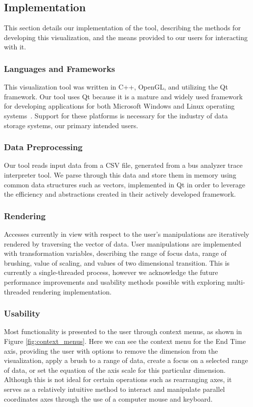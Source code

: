 \documentclass[journal]{vgtc}                %
\begin{document}
\subsection{Implementation}

This section details our implementation of the tool, describing the methods for developing this visualization, and the means provided to our users for interacting with it.

\subsubsection{Languages and Frameworks}
This visualization tool was written in C++, OpenGL, and utilizing the Qt framework. Our tool uses Qt because it is a mature and widely used framework for developing applications for both Microsoft Windows and Linux operating systems~\cite{qt:nokia}. Support for these platforms is necessary for the industry of data storage systems, our primary intended users.

\subsubsection{Data Preprocessing}
Our tool reads input data from a CSV file, generated from a bus analyzer trace interpreter tool. We parse through this data and store them in memory using common data structures such as vectors, implemented in Qt in order to leverage the efficiency and abstractions created in their actively developed framework. 

\subsubsection{Rendering}
Accesses currently in view with respect to the user's manipulations are iteratively rendered by traversing the vector of data. User manipulations are implemented with transformation variables, describing the range of focus data, range of brushing, value of scaling, and values of two dimensional transition. This is currently a single-threaded process, however we acknowledge the future performance improvements and usability methods possible with exploring multi-threaded rendering implementation.

\subsubsection{Usability}
Most functionality is presented to the user through context menus, as shown in Figure \ref{fig:context_menus}. Here we can see the context menu for the End Time axis, providing the user with options to remove the dimension from the visualization, apply a brush to a range of data, create a focus on a selected range of data, or set the equation of the axis scale for this particular dimension. Although this is not ideal for certain operations such as rearranging axes, it serves as a relatively intuitive method to interact and manipulate parallel coordinates axes through the use of a computer mouse and keyboard.
\end{document}
